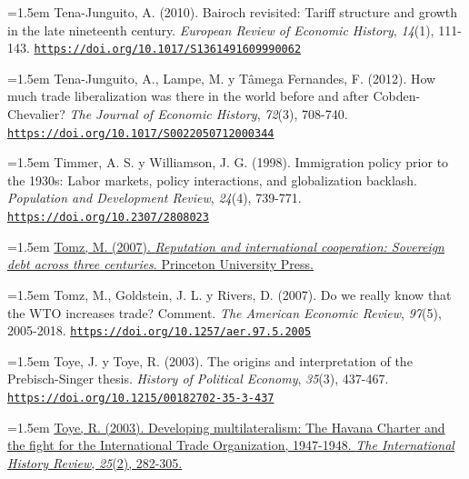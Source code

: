 \documentclass[10pt,a4paper]{article}
\begin{document}
{\sloppy\noindent\hangindent=1.5em Tena-Junguito, A. (2010). Bairoch revisited: Tariff structure and growth in the late nineteenth century. \textit{European Review of Economic History}, \textit{14}(1), 111-143. \href{https://doi.org/10.1017/S1361491609990062}{\nolinkurl{https://doi.org/10.1017/S1361491609990062}}\par}

{\sloppy\noindent\hangindent=1.5em Tena-Junguito, A., Lampe, M. y Tâmega Fernandes, F. (2012). How much trade liberalization was there in the world before and after Cobden-Chevalier? \textit{The Journal of Economic History}, \textit{72}(3), 708-740. \href{https://doi.org/10.1017/S0022050712000344}{\nolinkurl{https://doi.org/10.1017/S0022050712000344}}\par}

{\sloppy\noindent\hangindent=1.5em Timmer, A. S. y Williamson, J. G. (1998). Immigration policy prior to the 1930s: Labor markets, policy interactions, and globalization backlash. \textit{Population and Development Review}, \textit{24}(4), 739-771. \href{https://doi.org/10.2307/2808023}{\nolinkurl{https://doi.org/10.2307/2808023}}\par}

{\sloppy\noindent\hangindent=1.5em \href{https://press.princeton.edu/node/61573}{Tomz, M. (2007). \textit{Reputation and international cooperation: Sovereign debt across three centuries}. Princeton University Press.}\par}

{\sloppy\noindent\hangindent=1.5em Tomz, M., Goldstein, J. L. y Rivers, D. (2007). Do we really know that the WTO increases trade? Comment. \textit{The American Economic Review}, \textit{97}(5), 2005-2018. \href{https://doi.org/10.1257/aer.97.5.2005}{\nolinkurl{https://doi.org/10.1257/aer.97.5.2005}}\par}

{\sloppy\noindent\hangindent=1.5em Toye, J. y Toye, R. (2003). The origins and interpretation of the Prebisch-Singer thesis. \textit{History of Political Economy}, \textit{35}(3), 437-467. \href{https://doi.org/10.1215/00182702-35-3-437}{\nolinkurl{https://doi.org/10.1215/00182702-35-3-437}}\par}

{\sloppy\noindent\hangindent=1.5em \href{http://hdl.handle.net/10036/19572}{Toye, R. (2003). Developing multilateralism: The Havana Charter and the fight for the International Trade Organization, 1947-1948. \textit{The International History Review}, \textit{25}(2), 282-305.}\par}
\end{document}
